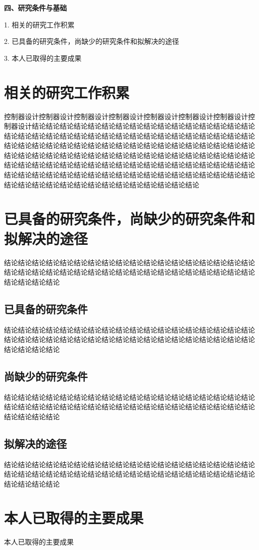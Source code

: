 \textbf{\fangsong\xiaosihao 四、研究条件与基础}
\begin{ubox}
	\setcounter{section}{0}
	\setcounter{figure}{0}
	\setcounter{table}{0}
	\setlength{\parindent}{0em} 
	1. 相关的研究工作积累
	\vspace{-0.25cm}
	
	2. 已具备的研究条件，尚缺少的研究条件和拟解决的途径
	\vspace{-0.25cm}
	
	3. 本人已取得的主要成果
	
	\setlength{\parindent}{2em} 
	\section{相关的研究工作积累}
	控制器设计控制器设计控制器设计控制器设计控制器设计控制器设计控制器设计控制器设计结论结论结论结论结论结论结论结论结论结论结论结论结论结论结论结论结论结论结论结论结论结论结论结论结论结论结论结论结论结论结论结论结论结论结论结论结论结论结论结论结论结论结论结论结论结论结论结论结论结论结论结论结论结论结论结论结论结论结论结论结论结论结论结论结论结论结论结论结论结论结论结论结论结论结论结论结论结论结论结论结论结论结论结论结论结论结论结论结论结论结论结论结论结论结论结论结论结论结论结论结论结论结论结论结论结论结论结论结论结论结论结论结论结论结论结论结论结论结论结论
	\section{已具备的研究条件，尚缺少的研究条件和拟解决的途径}
	结论结论结论结论结论结论结论结论结论结论结论结论结论结论结论结论结论结论结论结论结论结论结论结论结论结论结论结论结论结论结论结论结论结论结论结论结论结论结论结论
\subsection{已具备的研究条件}
结论结论结论结论结论结论结论结论结论结论结论结论结论结论结论结论结论结论结论结论结论结论结论结论结论结论结论结论结论结论结论结论结论结论结论结论结论结论结论结论
\subsection{尚缺少的研究条件}
结论结论结论结论结论结论结论结论结论结论结论结论结论结论结论结论结论结论结论结论结论结论结论结论结论结论结论结论结论结论结论结论结论结论结论结论结论结论结论结论
\subsection{拟解决的途径}
结论结论结论结论结论结论结论结论结论结论结论结论结论结论结论结论结论结论结论结论结论结论结论结论结论结论结论结论结论结论结论结论结论结论结论结论结论结论结论结论
\section{本人已取得的主要成果}
本人已取得的主要成果
\end{ubox}
